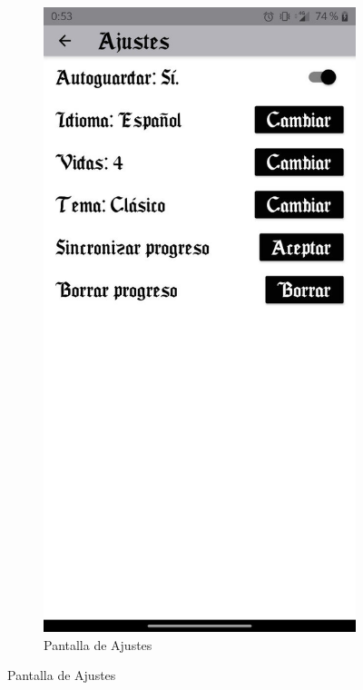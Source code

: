   \begin{figure}[H]
    \centering
    \begin{subfigure}[b]{0.4\linewidth}
      \includegraphics[width=\linewidth]{images/man10.jpeg}
      \caption{Pantalla de Ajustes}

\end{subfigure}
\end{figure}
